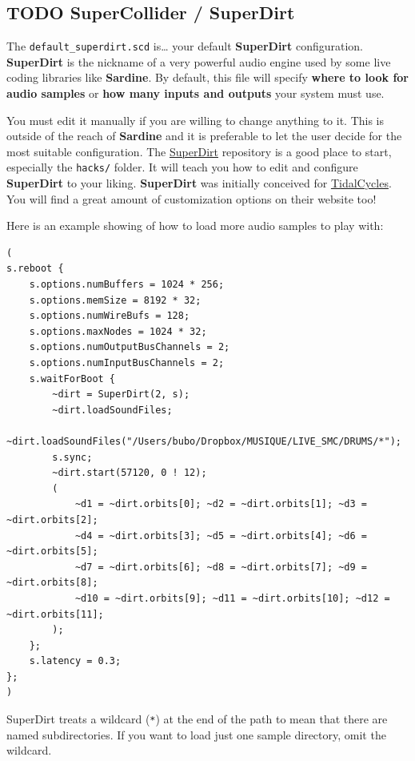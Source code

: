 \documentclass[11pt]{article}
\begin{document}
\subsection{{\bfseries\sffamily TODO} SuperCollider / SuperDirt}
\label{sec:org75ab131}

The \texttt{default\_superdirt.scd} is\ldots{} your default \textbf{SuperDirt} configuration. \textbf{SuperDirt} is the nickname of a very powerful audio engine used by some live coding libraries like \textbf{Sardine}. By default, this file will specify \textbf{where to look for audio samples} or \textbf{how many inputs and outputs} your system must use.

You must edit it manually if you are willing to change anything to it. This is outside of the reach of \textbf{Sardine} and it is preferable to let the user decide for the most suitable configuration. The \href{https://github.com/musikinformatik/SuperDirt}{SuperDirt} repository is a good place to start, especially the \texttt{hacks/} folder. It will teach you how to edit and configure \textbf{SuperDirt} to your liking. \textbf{SuperDirt} was initially conceived for \href{https://tidalcycles.org/}{TidalCycles}. You will find a great amount of customization options on their website too!

Here is an example showing of how to load more audio samples to play with:

\begin{verbatim}
(
s.reboot {
    s.options.numBuffers = 1024 * 256;
    s.options.memSize = 8192 * 32;
    s.options.numWireBufs = 128;
    s.options.maxNodes = 1024 * 32;
    s.options.numOutputBusChannels = 2;
    s.options.numInputBusChannels = 2;
    s.waitForBoot {
        ~dirt = SuperDirt(2, s);
        ~dirt.loadSoundFiles;
        ~dirt.loadSoundFiles("/Users/bubo/Dropbox/MUSIQUE/LIVE_SMC/DRUMS/*");
        s.sync;
        ~dirt.start(57120, 0 ! 12);
        (
            ~d1 = ~dirt.orbits[0]; ~d2 = ~dirt.orbits[1]; ~d3 = ~dirt.orbits[2];
            ~d4 = ~dirt.orbits[3]; ~d5 = ~dirt.orbits[4]; ~d6 = ~dirt.orbits[5];
            ~d7 = ~dirt.orbits[6]; ~d8 = ~dirt.orbits[7]; ~d9 = ~dirt.orbits[8];
            ~d10 = ~dirt.orbits[9]; ~d11 = ~dirt.orbits[10]; ~d12 = ~dirt.orbits[11];
        );
    };
    s.latency = 0.3;
};
)
\end{verbatim}

SuperDirt treats a wildcard (\texttt{*}) at the end of the path to mean that there are named subdirectories. If you want to load just one sample directory, omit the wildcard.
\end{document}
